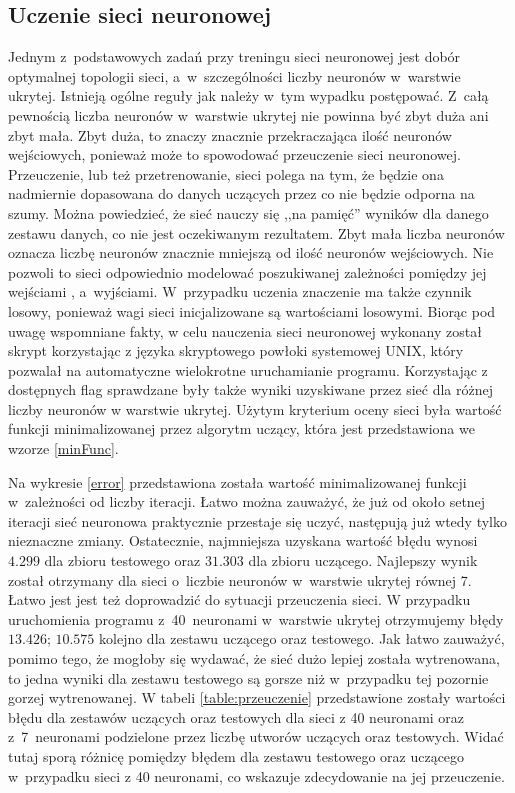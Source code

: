 \subsection{Uczenie sieci neuronowej}
Jednym z~podstawowych zadań przy treningu sieci neuronowej jest dobór optymalnej topologii sieci, a~w~szczególności liczby neuronów w~warstwie ukrytej. Istnieją ogólne reguły jak należy w~tym wypadku postępować. 
Z~całą pewnością liczba neuronów w~warstwie ukrytej nie powinna być zbyt duża ani zbyt mała. Zbyt duża, to znaczy znacznie przekraczająca ilość neuronów wejściowych, ponieważ może to spowodować przeuczenie sieci neuronowej. Przeuczenie, lub też przetrenowanie, sieci polega na tym, że będzie ona nadmiernie dopasowana do danych uczących przez co nie będzie odporna na szumy. Można powiedzieć, że sieć nauczy się ,,na pamięć'' wyników dla danego zestawu danych, co nie jest oczekiwanym rezultatem. Zbyt mała liczba neuronów oznacza liczbę neuronów znacznie mniejszą od ilość neuronów wejściowych. Nie pozwoli to sieci odpowiednio modelować poszukiwanej zależności pomiędzy jej wejściami , a~wyjściami. W~przypadku uczenia znaczenie ma także czynnik losowy, ponieważ wagi sieci inicjalizowane są wartościami losowymi. Biorąc pod uwagę wspomniane fakty, w celu nauczenia sieci neuronowej wykonany został skrypt korzystając z języka skryptowego powłoki systemowej UNIX, który pozwalał na automatyczne wielokrotne uruchamianie programu. Korzystając z dostępnych flag sprawdzane były także wyniki uzyskiwane przez sieć dla różnej liczby neuronów w warstwie ukrytej. Użytym kryterium oceny sieci była wartość funkcji minimalizowanej przez algorytm uczący, która jest przedstawiona we wzorze \ref{minFunc}.

Na wykresie \ref{error} przedstawiona została wartość minimalizowanej funkcji w~zależności od liczby iteracji. Łatwo można zauważyć, że już od około setnej iteracji sieć neuronowa praktycznie przestaje się uczyć, następują już wtedy tylko nieznaczne zmiany. Ostatecznie, najmniejsza uzyskana wartość błędu wynosi $4.299$ dla zbioru testowego oraz $31.303$ dla zbioru uczącego. Najlepszy wynik został otrzymany dla sieci o~liczbie neuronów w~warstwie ukrytej równej 7. Łatwo jest jest też doprowadzić do sytuacji przeuczenia sieci. W przypadku uruchomienia programu z~40~neuronami w~warstwie ukrytej otrzymujemy błędy $13.426$; $10.575$ kolejno dla zestawu uczącego oraz testowego. Jak łatwo zauważyć, pomimo tego, że mogłoby się wydawać, że sieć dużo lepiej została wytrenowana, to jedna wyniki dla zestawu testowego są gorsze niż w~przypadku tej pozornie gorzej wytrenowanej. W tabeli \ref{table:przeuczenie} przedstawione zostały wartości błędu dla zestawów uczących oraz testowych dla sieci z 40 neuronami oraz z~7~neuronami podzielone przez liczbę utworów uczących oraz testowych. Widać tutaj sporą różnicę pomiędzy błędem dla zestawu testowego oraz uczącego w~przypadku sieci z 40 neuronami, co wskazuje zdecydowanie na jej przeuczenie.


